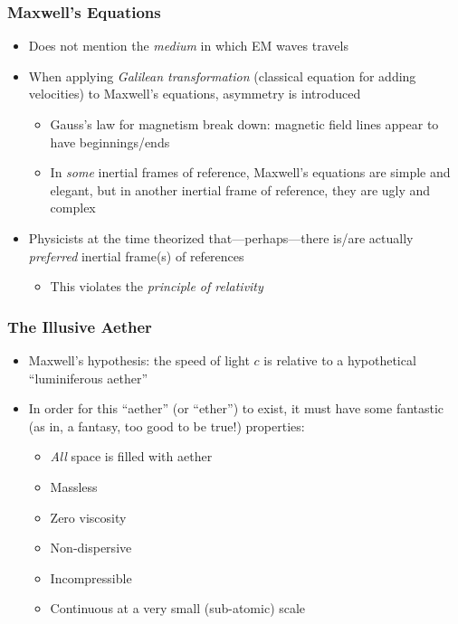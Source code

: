 \documentclass[12pt,compress,aspectratio=169]{beamer}
\begin{document}
\begin{frame}
  \frametitle{Maxwell's Equations}
  \begin{itemize}
  \item Does not mention the \emph{medium} in which EM waves travels
  \item When applying \emph{Galilean transformation} (classical equation for
    adding velocities) to Maxwell's equations, asymmetry is introduced
    \begin{itemize}
    \item Gauss's law for magnetism break down: magnetic field lines appear to
      have beginnings/ends
    \item In \emph{some} inertial frames of reference,
      Maxwell's equations are simple and elegant, but in another inertial frame
      of reference, they are ugly and complex
    \end{itemize}
  \item Physicists at the time theorized that---perhaps---there is/are actually
    \emph{preferred} inertial frame(s) of references
    \begin{itemize}
    \item This violates the \emph{principle of relativity}
    \end{itemize}
  \end{itemize}
\end{frame}


\begin{frame}
  \frametitle{The Illusive Aether}
  \begin{itemize}
  \item Maxwell's hypothesis: the speed of light $c$ is relative to a
    hypothetical ``luminiferous aether''
  \item In order for this ``aether'' (or ``ether'') to exist, it must have some
    fantastic (as in, a fantasy, too good to be true!) properties:
    \begin{itemize}
    \item \emph{All} space is filled with aether
    \item Massless
    \item Zero viscosity
    \item Non-dispersive
    \item Incompressible
    \item Continuous at a very small (sub-atomic) scale
    \end{itemize}
  \end{itemize}
\end{frame}
\end{document}
